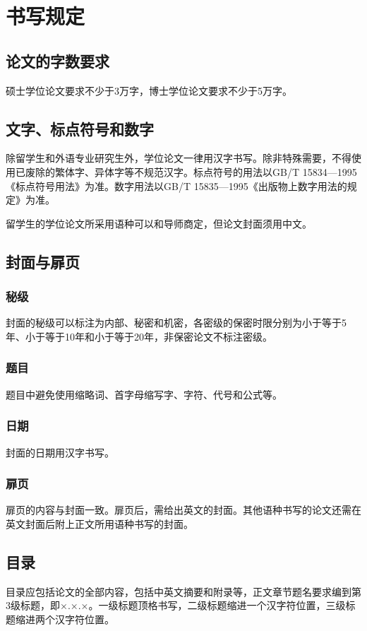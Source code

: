 \section{书写规定}

\subsection{论文的字数要求}
硕士学位论文要求不少于3万字，博士学位论文要求不少于5万字。

\subsection{文字、标点符号和数字}
除留学生和外语专业研究生外，学位论文一律用汉字书写。除非特殊需要，不得使用已废除的繁体字、异体字等不规范汉字。标点符号的用法以GB/T 15834—1995《标点符号用法》为准。数字用法以GB/T 15835—1995《出版物上数字用法的规定》为准。

留学生的学位论文所采用语种可以和导师商定，但论文封面须用中文。

\subsection{封面与扉页}
\subsubsection{秘级} 封面的秘级可以标注为内部、秘密和机密，各密级的保密时限分别为小于等于5年、小于等于10年和小于等于20年，非保密论文不标注密级。
\subsubsection{题目} 题目中避免使用缩略词、首字母缩写字、字符、代号和公式等。
\subsubsection{日期} 封面的日期用汉字书写。
\subsubsection{扉页} 扉页的内容与封面一致。扉页后，需给出英文的封面。其他语种书写的论文还需在英文封面后附上正文所用语种书写的封面。

\subsection{目录}
目录应包括论文的全部内容，包括中英文摘要和附录等，正文章节题名要求编到第3级标题，即×.×.×。一级标题顶格书写，二级标题缩进一个汉字符位置，三级标题缩进两个汉字符位置。

